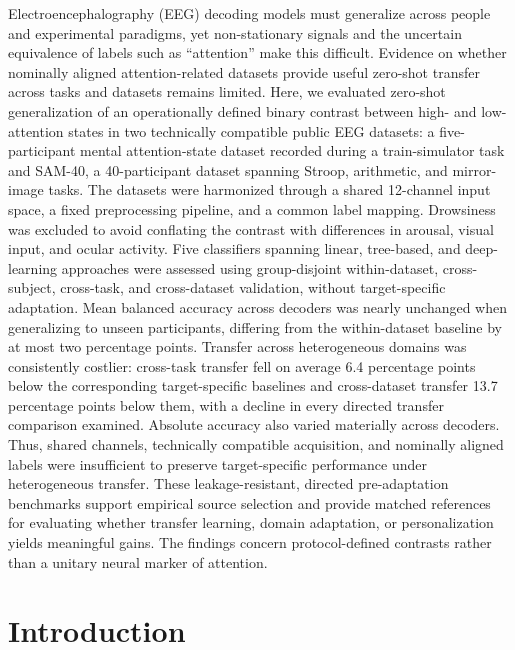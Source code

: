 \documentclass[10pt,letterpaper]{article}
\begin{document}
Electroencephalography (EEG) decoding models must generalize across people and experimental paradigms, yet non-stationary signals and the uncertain equivalence of labels such as ``attention'' make this difficult. Evidence on whether nominally aligned attention-related datasets provide useful zero-shot transfer across tasks and datasets remains limited. Here, we evaluated zero-shot generalization of an operationally defined binary contrast between high- and low-attention states in two technically compatible public EEG datasets: a five-participant mental attention-state dataset recorded during a train-simulator task and SAM-40, a 40-participant dataset spanning Stroop, arithmetic, and mirror-image tasks. The datasets were harmonized through a shared 12-channel input space, a fixed preprocessing pipeline, and a common label mapping. Drowsiness was excluded to avoid conflating the contrast with differences in arousal, visual input, and ocular activity. Five classifiers spanning linear, tree-based, and deep-learning approaches were assessed using group-disjoint within-dataset, cross-subject, cross-task, and cross-dataset validation, without target-specific adaptation. Mean balanced accuracy across decoders was nearly unchanged when generalizing to unseen participants, differing from the within-dataset baseline by at most two percentage points. Transfer across heterogeneous domains was consistently costlier: cross-task transfer fell on average 6.4 percentage points below the corresponding target-specific baselines and cross-dataset transfer 13.7 percentage points below them, with a decline in every directed transfer comparison examined. Absolute accuracy also varied materially across decoders. Thus, shared channels, technically compatible acquisition, and nominally aligned labels were insufficient to preserve target-specific performance under heterogeneous transfer. These leakage-resistant, directed pre-adaptation benchmarks support empirical source selection and provide matched references for evaluating whether transfer learning, domain adaptation, or personalization yields meaningful gains. The findings concern protocol-defined contrasts rather than a unitary neural marker of attention.

\clearpage
{}
\linenumbers

\section*{Introduction}
\end{document}
